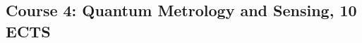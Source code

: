 \documentclass{scrreprt}
\begin{document}
\begin{comment}
\textbf{Key Topics:}
\begin{itemize}
\item Qubit physical platforms: superconducting qubits (transmons, flux qubits) and circuit QED; trapped-ion qubits (linear RF traps, Penning traps); spin qubits in semiconductors (quantum dots, donor spins); photonic qubits (single photons, integrated photonic circuits); nitrogen vacancy (NV) centers and other solid-state defect qubits.
\item Qubit control and readout mechanisms: microwave control of superconducting qubits, laser manipulation of atomic qubits, optical measurement techniques (homodyne detection, single-photon detectors), and classical hardware for signal generation and detection.
\item Coherence and noise: sources of decoherence (phase noise, energy relaxation), quantitative measures of coherence (coherence time, fidelity), error rates and how they scale with system size.
\item Cryogenics and vacuum technology: dilution refrigerator operation for millikelvin temperatures, cryostats, ultra-high vacuum systems for ion and neutral atom devices.
\item Scalability and integration: 2D and 3D qubit integration, on-chip wiring and control lines, cross-talk management, emerging technologies for scaling (such as photonic interconnects between quantum modules, cryogenic CMOS control electronics).
\item Hardware-level error correction and mitigation: physical versus logical qubits, implementation of error-correcting codes in hardware (e.g., layout for the surface code, syndrome extraction circuitry), and trade-offs in resource overhead.
\item Overview of current quantum processors and roadmaps: examples of quantum chip architectures from industry or research (e.g., superconducting processors with 50+ qubits, ion trap systems with shuttling ions), and discussion of performance milestones (quantum volume, error rates approaching fault-tolerance thresholds).
\end{itemize}
\end{comment}
\subsection{Course 4: Quantum Metrology and Sensing, 10 ECTS}
\end{document}

